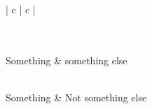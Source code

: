\documentclass[12pt, a4paper]{article}
\begin{document}
\begin{longtable}[c]{| c | c |}
 \caption{Long table caption.\label{tab:long}}\\

 \hline
 \\
 \hline
 Something & something else\\
 \hline
 \endfirsthead

 \hline
 \\
 \hline
 Something & Not something else\\
 \hline
 \endhead

 \hline
 \hline
  \\
 \hline
 \endfoot

 \hline
 \\
 \hline\hline
 \endlastfoot


\end{longtable}
\end{document}
